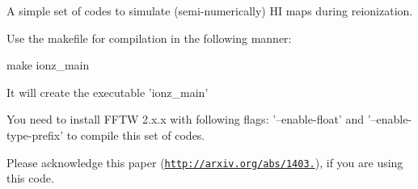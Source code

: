 A simple set of codes to simulate (semi-\/numerically) H\+I maps during reionization.

Use the makefile for compilation in the following manner\+:

make ionz\+\_\+main

It will create the executable 'ionz\+\_\+main'

You need to install F\+F\+T\+W 2.\+x.\+x with following flags\+: '--enable-\/float' and '--enable-\/type-\/prefix' to compile this set of codes.

Please acknowledge this paper (\href{http://arxiv.org/abs/1403.0941}{\tt http\+://arxiv.\+org/abs/1403.}), if you are using this code. 